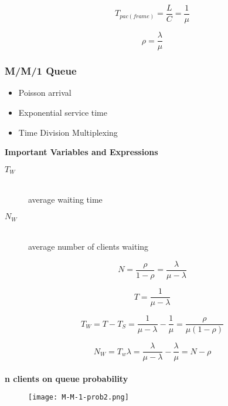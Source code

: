 \documentclass[../resumosRCOM.tex]{subfiles}
\begin{document}
\begin{equation}
    T_{pac(frame)} = \frac{L}{C} = \frac{1}{\mu}
\end{equation}

\begin{equation}
    \rho = \frac{\lambda}{\mu}
\end{equation}

\subsubsection{M/M/1 Queue}

\begin{itemize}
    \item Poisson arrival
    \item Exponential service time
    \item Time Division Multiplexing
\end{itemize}

\textbf{Important Variables and Expressions}
\begin{description}
    \item[\(T_{W}\)] \hfill \\ average waiting time
    \item[\(N_{W}\)] \hfill \\ average number of clients waiting
\end{description}

\begin{equation}
    N = \frac{\rho}{1-\rho} = \frac{\lambda}{\mu-\lambda}
\end{equation}

\begin{equation}
    T = \frac{1}{\mu-\lambda}
\end{equation}

\begin{equation}
    T_{W} = T - T_{S} = \frac{1}{\mu-\lambda} - \frac{1}{\mu} = \frac{\rho}{\mu(1-\rho)}
\end{equation}

\begin{equation}
    N_{W} = T_{w}\lambda = \frac{\lambda}{\mu-\lambda} - \frac{\lambda}{\mu} = N - \rho
\end{equation}

\paragraph{}
\textbf{n clients on queue probability}  

\begin{figure}[H]
    \centering
    \texttt{[image: M-M-1-prob2.png]}
\end{figure}
\end{document}
